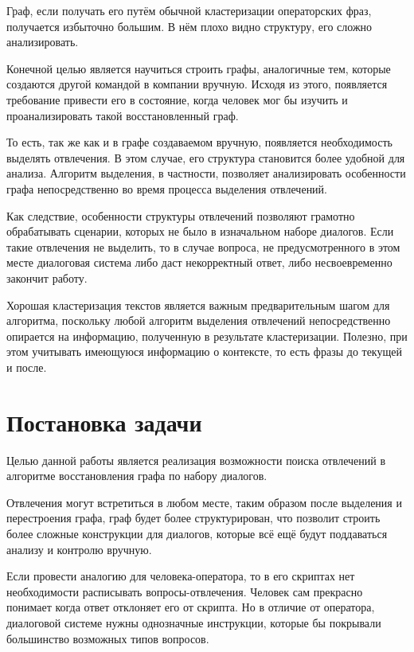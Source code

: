 \documentclass[times,specification,annotation]{itmo-student-thesis}
\begin{document}
	Граф, если получать его путём обычной кластеризации операторских фраз, получается избыточно большим. В нём плохо видно структуру, его сложно анализировать.
	
	Конечной целью является научиться строить графы, аналогичные тем, которые создаются другой командой в компании вручную. Исходя из этого, появляется требование привести его в состояние, когда человек мог бы изучить и проанализировать такой восстановленный граф. 
	
	То есть, так же как и в графе создаваемом вручную, появляется необходимость выделять отвлечения. В этом случае, его структура становится более удобной для анализа. Алгоритм выделения, в частности, позволяет анализировать особенности графа непосредственно во время процесса выделения отвлечений. 
	
	Как следствие, особенности структуры отвлечений позволяют грамотно обрабатывать сценарии, которых не было в изначальном наборе диалогов. Если такие отвлечения не выделить, то в случае вопроса, не предусмотренного в этом месте диалоговая система либо даст некорректный ответ, либо несвоевременно закончит работу.
	
	Хорошая кластеризация текстов является важным предварительным шагом для алгоритма, поскольку любой алгоритм выделения отвлечений непосредственно опирается на информацию, полученную в результате кластеризации. Полезно, при этом учитывать имеющуюся информацию о контексте, то есть фразы до текущей и после.
	
	
	\section{Постановка задачи}
	Целью данной работы является реализация возможности поиска отвлечений в алгоритме восстановления графа по набору диалогов.

	Отвлечения могут встретиться в любом месте, таким образом после выделения и перестроения графа, граф будет более структурирован, что позволит строить более сложные конструкции для диалогов, которые всё ещё будут поддаваться анализу и контролю вручную.
	
	Если провести аналогию для человека-оператора, то в его скриптах нет необходимости расписывать вопросы-отвлечения. Человек сам прекрасно понимает когда ответ отклоняет его от скрипта. Но в отличие от оператора, диалоговой системе нужны однозначные инструкции, которые бы покрывали большинство возможных типов вопросов.
	
\end{document}

